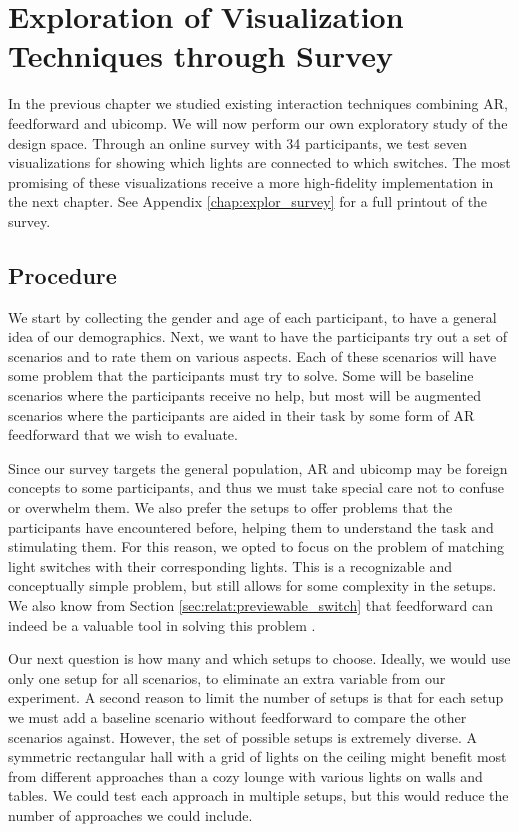 \chapter{Exploration of Visualization Techniques through Survey} \label{chap:explor}
In the previous chapter we studied existing interaction techniques combining AR, feedforward and ubicomp. We will now perform our own exploratory study of the design space. Through an online survey with 34 participants, we test seven visualizations for showing which lights are connected to which switches. The most promising of these visualizations receive a more high-fidelity implementation in the next chapter. See Appendix \ref{chap:explor_survey} for a full printout of the survey.

\section{Procedure} \label{sec:explor:procedure}
We start by collecting the gender and age of each participant, to have a general idea of our demographics. Next, we want to have the participants try out a set of scenarios and to rate them on various aspects. Each of these scenarios will have some problem that the participants must try to solve. Some will be baseline scenarios where the participants receive no help, but most will be augmented scenarios where the participants are aided in their task by some form of AR feedforward that we wish to evaluate.

Since our survey targets the general population, AR and ubicomp may be foreign concepts to some participants, and thus we must take special care not to confuse or overwhelm them. We also prefer the setups to offer problems that the participants have encountered before, helping them to understand the task and stimulating them. For this reason, we opted to focus on the problem of matching light switches with their corresponding lights. This is a recognizable and conceptually simple problem, but still allows for some complexity in the setups. We also know from Section \ref{sec:relat:previewable_switch} that feedforward can indeed be a valuable tool in solving this problem \cite{park2014previewable}.

Our next question is how many and which setups to choose. Ideally, we would use only one setup for all scenarios, to eliminate an extra variable from our experiment. A second reason to limit the number of setups is that for each setup we must add a baseline scenario without feedforward to compare the other scenarios against. However, the set of possible setups is extremely diverse. A symmetric rectangular hall with a grid of lights on the ceiling might benefit most from different approaches than a cozy lounge with various lights on walls and tables. We could test each approach in multiple setups, but this would reduce the number of approaches we could include.

